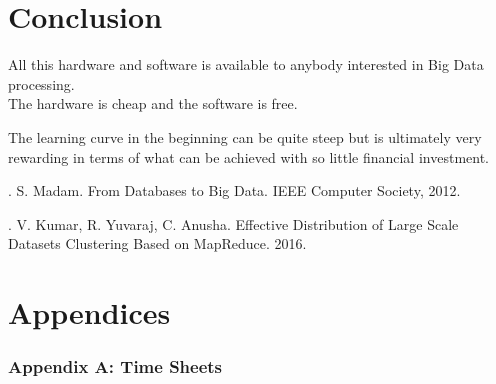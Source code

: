 \documentclass[12pt]{article} %
\begin{document}
	
	\section{Conclusion} %
	
	All this hardware and software is available to anybody interested in Big Data processing.\\
	
	The hardware is cheap and the software is free.\
	
	The learning curve in the beginning can be quite steep but is ultimately very rewarding in terms of what can be achieved with so little financial investment.
	
	
	
	
	\newpage
	
	
	\begin{thebibliography}{99} %
		
		. S. Madam. From Databases to Big Data. IEEE Computer Society, 2012.
	
		
		. V. Kumar, R. Yuvaraj, C. Anusha. Effective Distribution of Large Scale Datasets Clustering Based on MapReduce. 2016.

		
	\end{thebibliography}
	\newpage
	
	\section{Appendices}
	
	\subsubsection{Appendix A: Time Sheets}
	
\end{document}
